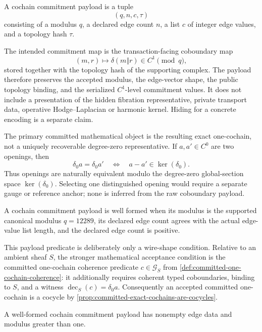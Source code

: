 \begin{definition}\label{def:cochain-commitment-payload}
  A cochain commitment payload is a tuple
  \[
    (q,n,c,\tau)
  \]
  consisting of a modulus \(q\), a declared edge count \(n\), a list \(c\) of
  integer edge values, and a topology hash \(\tau\).
\end{definition}

The intended commitment map is the transaction-facing coboundary map
\[
  (m,r) \longmapsto \delta(m\Vert r) \in C^1 \pmod q,
\]
stored together with the topology hash of the supporting complex. The payload
therefore preserves the accepted modulus, the edge-vector shape, the public
topology binding, and the serialized \(C^1\)-level commitment values. It does
not include a presentation of the hidden fibration representative, private
transport data, operative Hodge--Laplacian or harmonic kernel. Hiding for a
concrete encoding is a separate claim.

The primary committed mathematical object is the resulting exact
one-cochain, not a uniquely recoverable degree-zero representative. If
\(a,a'\in C^0\) are two openings, then
\[
  \delta_0a=\delta_0a'
  \quad\Longleftrightarrow\quad
  a-a'\in\ker(\delta_0).
\]
Thus openings are naturally equivalent modulo the degree-zero global-section
space \(\ker(\delta_0)\). Selecting one distinguished opening would require a
separate gauge or reference anchor; none is inferred from the raw coboundary
payload.

\begin{definition}\label{def:commitment-well-formedness}
  A cochain commitment payload is well formed when its modulus is the supported
  canonical modulus \(q=12289\), its declared edge count agrees with the actual
  edge-value list length, and the declared edge count is positive.
\end{definition}

This payload predicate is deliberately only a wire-shape condition. Relative
to an ambient sheaf \(S\), the stronger mathematical acceptance condition is
the committed one-cochain coherence predicate \(c\in\mathcal G_S\) from
\cref{def:committed-one-cochain-coherence}: it additionally requires coherent
typed coboundaries, binding to \(S\), and a witness
\(\operatorname{dec}_S(c)=\delta_0a\). Consequently an accepted committed
one-cochain is a cocycle by
\cref{prop:committed-exact-cochains-are-cocycles}.

\begin{proposition}\label{prop:well-formed-committed-payloads}
  A well-formed cochain commitment payload has nonempty edge data and modulus
  greater than one.
\end{proposition}

